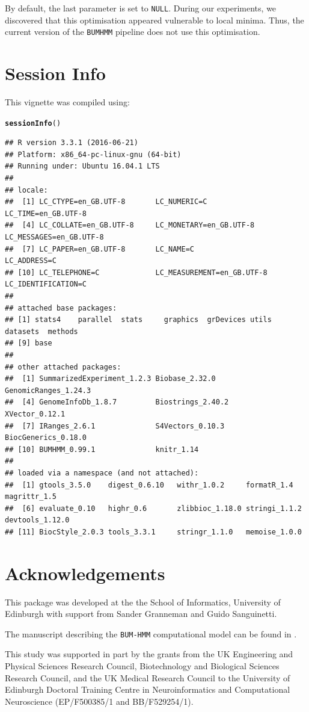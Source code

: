 \documentclass{article}\usepackage[]{graphicx}\usepackage[usenames,dvipsnames]{color}
\makeatletter
\newcommand{\hlstd}[1]{\textcolor[rgb]{0.345,0.345,0.345}{#1}}%
\newcommand{\hlkwd}[1]{\textcolor[rgb]{0.737,0.353,0.396}{\textbf{#1}}}%
\newenvironment{kframe}{%
 \def\at@end@of@kframe{}%
 \ifinner\ifhmode%
  \def\at@end@of@kframe{\end{minipage}}%
  \begin{minipage}{\columnwidth}%
 \fi\fi%
 \def\FrameCommand##1{\hskip\@totalleftmargin \hskip-\fboxsep
 \colorbox{shadecolor}{##1}\hskip-\fboxsep
     \hskip-\linewidth \hskip-\@totalleftmargin \hskip\columnwidth}%
 \MakeFramed {\advance\hsize-\width
   \@totalleftmargin\z@ \linewidth\hsize
   \@setminipage}}%
 {\par\unskip\endMakeFramed%
 \at@end@of@kframe}
\newenvironment{knitrout}{}{} %
\makeatother
\begin{document}
By default, the last parameter is set to \texttt{NULL}. During our experiments,
we discovered that this optimisation appeared vulnerable to local minima. Thus,
the current version of the \verb|BUMHMM| pipeline does not use this
optimisation.

\section{Session Info}
This vignette was compiled using:
\begin{knitrout}
\color{fgcolor}\begin{kframe}
\begin{alltt}
\hlkwd{sessionInfo}\hlstd{()}
\end{alltt}
\begin{verbatim}
## R version 3.3.1 (2016-06-21)
## Platform: x86_64-pc-linux-gnu (64-bit)
## Running under: Ubuntu 16.04.1 LTS
## 
## locale:
##  [1] LC_CTYPE=en_GB.UTF-8       LC_NUMERIC=C               LC_TIME=en_GB.UTF-8       
##  [4] LC_COLLATE=en_GB.UTF-8     LC_MONETARY=en_GB.UTF-8    LC_MESSAGES=en_GB.UTF-8   
##  [7] LC_PAPER=en_GB.UTF-8       LC_NAME=C                  LC_ADDRESS=C              
## [10] LC_TELEPHONE=C             LC_MEASUREMENT=en_GB.UTF-8 LC_IDENTIFICATION=C       
## 
## attached base packages:
## [1] stats4    parallel  stats     graphics  grDevices utils     datasets  methods  
## [9] base     
## 
## other attached packages:
##  [1] SummarizedExperiment_1.2.3 Biobase_2.32.0             GenomicRanges_1.24.3      
##  [4] GenomeInfoDb_1.8.7         Biostrings_2.40.2          XVector_0.12.1            
##  [7] IRanges_2.6.1              S4Vectors_0.10.3           BiocGenerics_0.18.0       
## [10] BUMHMM_0.99.1              knitr_1.14                
## 
## loaded via a namespace (and not attached):
##  [1] gtools_3.5.0    digest_0.6.10   withr_1.0.2     formatR_1.4     magrittr_1.5   
##  [6] evaluate_0.10   highr_0.6       zlibbioc_1.18.0 stringi_1.1.2   devtools_1.12.0
## [11] BiocStyle_2.0.3 tools_3.3.1     stringr_1.1.0   memoise_1.0.0
\end{verbatim}
\end{kframe}
\end{knitrout}

\section{Acknowledgements}
This package was developed at the the School of Informatics, University of
Edinburgh with support from Sander Granneman and Guido Sanguinetti.

The manuscript describing the \verb|BUM-HMM| computational model can be found in
\cite{selega2016robust}.

This study was supported in part by the grants from the UK Engineering and
Physical Sciences Research Council, Biotechnology and Biological Sciences
Research Council, and the UK Medical Research Council to the University of
Edinburgh Doctoral Training Centre in Neuroinformatics and Computational
Neuroscience (EP/F500385/1 and BB/F529254/1).


\end{document}
